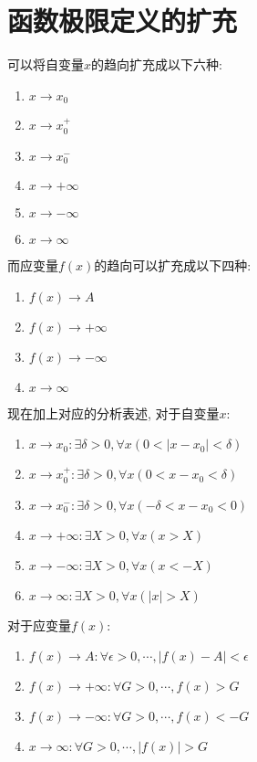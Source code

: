 \documentclass[lang=cn]{elegantbook}
\begin{document}
\section{函数极限定义的扩充}
可以将自变量$x$的趋向扩充成以下六种:
\begin{enumerate}
    \item $x \to x_0$
    \item $x \to x_0^+$
    \item $x \to x_0^-$
    \item $x \to +\infty$
    \item $x \to -\infty$
    \item $x \to \infty$
\end{enumerate}
而应变量$f(x)$的趋向可以扩充成以下四种:
\begin{enumerate}
    \item $f(x) \to A$
    \item $f(x) \to +\infty$
    \item $f(x) \to -\infty$
    \item $x \to \infty$
\end{enumerate}
现在加上对应的分析表述, 对于自变量$x$:
\begin{enumerate}
    \item $x \to x_0: \exists \delta > 0, \forall x(0 < \left| x - x_0 \right| < \delta)$
    \item $x \to x_0^+: \exists \delta > 0, \forall x(0 < x - x_0 < \delta)$
    \item $x \to x_0^-: \exists \delta > 0, \forall x(-\delta < x - x_0 < 0)$
    \item $x \to +\infty: \exists X > 0, \forall x(x > X)$
    \item $x \to -\infty: \exists X > 0, \forall x(x < -X)$
    \item $x \to \infty: \exists X > 0, \forall x(\left| x \right| > X)$
\end{enumerate}
对于应变量$f(x)$: 
\begin{enumerate}
    \item $f(x) \to A: \forall \epsilon > 0, \cdots,\left| f(x) - A \right| < \epsilon$
    \item $f(x) \to +\infty: \forall G > 0, \cdots, f(x) > G$
    \item $f(x) \to -\infty: \forall G > 0, \cdots, f(x) < -G$
    \item $x \to \infty: \forall G > 0, \cdots, \left| f(x) \right| > G$
\end{enumerate}
\end{document}
